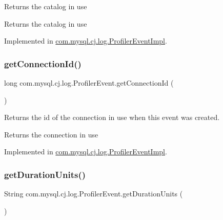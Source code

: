 Returns the catalog in use

\begin{DoxyReturn}{Returns}
the catalog in use 
\end{DoxyReturn}


Implemented in \mbox{\hyperlink{classcom_1_1mysql_1_1cj_1_1log_1_1_profiler_event_impl_a78b1417ac3c37a238b864c8ab4a4979f}{com.\+mysql.\+cj.\+log.\+Profiler\+Event\+Impl}}.

\mbox{\label{interfacecom_1_1mysql_1_1cj_1_1log_1_1_profiler_event_ac1990bb68ea1968dc7c432523e822fab}} 
\subsubsection{\texorpdfstring{get\+Connection\+Id()}{getConnectionId()}}
{\footnotesize\ttfamily long com.\+mysql.\+cj.\+log.\+Profiler\+Event.\+get\+Connection\+Id (\begin{DoxyParamCaption}{ }\end{DoxyParamCaption})}

Returns the id of the connection in use when this event was created.

\begin{DoxyReturn}{Returns}
the connection in use 
\end{DoxyReturn}


Implemented in \mbox{\hyperlink{classcom_1_1mysql_1_1cj_1_1log_1_1_profiler_event_impl_ac9658ff85b167806a14fb3496d97372b}{com.\+mysql.\+cj.\+log.\+Profiler\+Event\+Impl}}.

\mbox{\label{interfacecom_1_1mysql_1_1cj_1_1log_1_1_profiler_event_aabb8272339aac8d5fd4985da51c93cd9}} 
\subsubsection{\texorpdfstring{get\+Duration\+Units()}{getDurationUnits()}}
{\footnotesize\ttfamily String com.\+mysql.\+cj.\+log.\+Profiler\+Event.\+get\+Duration\+Units (\begin{DoxyParamCaption}{ }\end{DoxyParamCaption})}


